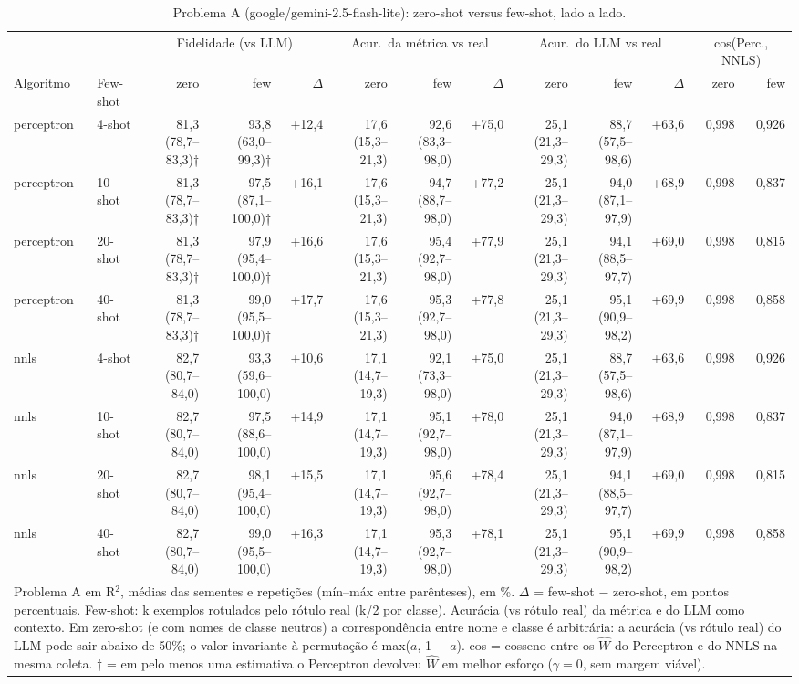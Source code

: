 \begin{table}[htbp]
\centering
\footnotesize
\caption{Problema A (google/gemini-2.5-flash-lite): zero-shot versus few-shot, lado a lado.}
\label{tab:T6_zero_few_A_flashlite}
\begin{tabular}{llrrrrrrrrrrr}
\toprule
 &  & \multicolumn{3}{c}{Fidelidade (vs LLM)} & \multicolumn{3}{c}{Acur.\ da métrica vs real} & \multicolumn{3}{c}{Acur.\ do LLM vs real} & \multicolumn{2}{c}{cos(Perc., NNLS)} \\ \cmidrule(lr){3-5} \cmidrule(lr){6-8} \cmidrule(lr){9-11} \cmidrule(lr){12-13}
Algoritmo & Few-shot & zero & few & $\Delta$ & zero & few & $\Delta$ & zero & few & $\Delta$ & zero & few \\
\midrule
perceptron & 4-shot & 81,3 (78,7–83,3)† & 93,8 (63,0–99,3)† & +12,4 & 17,6 (15,3–21,3) & 92,6 (83,3–98,0) & +75,0 & 25,1 (21,3–29,3) & 88,7 (57,5–98,6) & +63,6 & 0,998 & 0,926 \\
perceptron & 10-shot & 81,3 (78,7–83,3)† & 97,5 (87,1–100,0)† & +16,1 & 17,6 (15,3–21,3) & 94,7 (88,7–98,0) & +77,2 & 25,1 (21,3–29,3) & 94,0 (87,1–97,9) & +68,9 & 0,998 & 0,837 \\
perceptron & 20-shot & 81,3 (78,7–83,3)† & 97,9 (95,4–100,0)† & +16,6 & 17,6 (15,3–21,3) & 95,4 (92,7–98,0) & +77,9 & 25,1 (21,3–29,3) & 94,1 (88,5–97,7) & +69,0 & 0,998 & 0,815 \\
perceptron & 40-shot & 81,3 (78,7–83,3)† & 99,0 (95,5–100,0)† & +17,7 & 17,6 (15,3–21,3) & 95,3 (92,7–98,0) & +77,8 & 25,1 (21,3–29,3) & 95,1 (90,9–98,2) & +69,9 & 0,998 & 0,858 \\
\midrule
nnls & 4-shot & 82,7 (80,7–84,0) & 93,3 (59,6–100,0) & +10,6 & 17,1 (14,7–19,3) & 92,1 (73,3–98,0) & +75,0 & 25,1 (21,3–29,3) & 88,7 (57,5–98,6) & +63,6 & 0,998 & 0,926 \\
nnls & 10-shot & 82,7 (80,7–84,0) & 97,5 (88,6–100,0) & +14,9 & 17,1 (14,7–19,3) & 95,1 (92,7–98,0) & +78,0 & 25,1 (21,3–29,3) & 94,0 (87,1–97,9) & +68,9 & 0,998 & 0,837 \\
nnls & 20-shot & 82,7 (80,7–84,0) & 98,1 (95,4–100,0) & +15,5 & 17,1 (14,7–19,3) & 95,6 (92,7–98,0) & +78,4 & 25,1 (21,3–29,3) & 94,1 (88,5–97,7) & +69,0 & 0,998 & 0,815 \\
nnls & 40-shot & 82,7 (80,7–84,0) & 99,0 (95,5–100,0) & +16,3 & 17,1 (14,7–19,3) & 95,3 (92,7–98,0) & +78,1 & 25,1 (21,3–29,3) & 95,1 (90,9–98,2) & +69,9 & 0,998 & 0,858 \\
\bottomrule
\multicolumn{13}{p{0.95\linewidth}}{\footnotesize Problema A em R$^2$, médias das sementes e repetições (mín–máx entre parênteses), em \%. $\Delta$ = few-shot $-$ zero-shot, em pontos percentuais. Few-shot: k exemplos rotulados pelo rótulo real (k/2 por classe). Acurácia (vs rótulo real) da métrica e do LLM como contexto. Em zero-shot (e com nomes de classe neutros) a correspondência entre nome e classe é arbitrária: a acurácia (vs rótulo real) do LLM pode sair abaixo de 50\%; o valor invariante à permutação é max($a$, 1 $-$ $a$). cos = cosseno entre os $\hat{W}$ do Perceptron e do NNLS na mesma coleta. † = em pelo menos uma estimativa o Perceptron devolveu $\hat{W}$ em melhor esforço ($\gamma = 0$, sem margem viável).} \\
\end{tabular}
\end{table}
